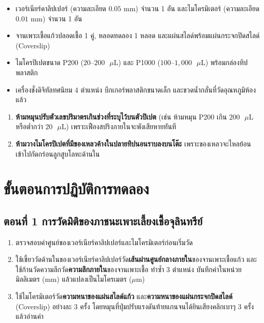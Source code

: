 \begin{equipbox}
\begin{itemize}
    \item เวอร์เนียร์คาลิปเปอร์ (ความละเอียด $0.05\text{ mm}$) จำนวน 1 อัน และไมโครมิเตอร์ (ความละเอียด $0.01\text{ mm}$) จำนวน 1 อัน
    \item จานเพาะเชื้อแก้วปลอดเชื้อ 1 คู่, หลอดทดลอง 1 หลอด และแผ่นสไลด์พร้อมแผ่นกระจกปิดสไลด์ (Coverslip)
    \item ไมโครปิเปตขนาด P200 ($20\text{--}200\text{ }\mu\text{L}$) และ P1000 ($100\text{--}1{,}000\text{ }\mu\text{L}$) พร้อมกล่องทิปพลาสติก
    \item เครื่องชั่งดิจิทัลทศนิยม 4 ตำแหน่ง บีกเกอร์พลาสติกขนาดเล็ก และขวดน้ำกลั่นที่วัดอุณหภูมิห้องแล้ว
\end{itemize}
\end{equipbox}

\begin{warningbox}
\begin{enumerate}
    \item \textbf{ห้ามหมุนปรับตัวเลขปริมาตรเกินช่วงที่ระบุไว้บนตัวปิเปต} (เช่น ห้ามหมุน P200 เกิน $200\text{ }\mu\text{L}$ หรือต่ำกว่า $20\text{ }\mu\text{L}$) เพราะเฟืองสปริงภายในจะพังเสียหายทันที
    \item \textbf{ห้ามวางไมโครปิเปตที่มีของเหลวค้างในปลายทิปนอนราบลงบนโต๊ะ} เพราะของเหลวจะไหลย้อนเข้าไปกัดกร่อนลูกสูบโลหะด้านใน
\end{enumerate}
\end{warningbox}

\section{ขั้นตอนการปฏิบัติการทดลอง}

\subsection{ตอนที่ 1 การวัดมิติของภาชนะเพาะเลี้ยงเชื้อจุลินทรีย์}
\begin{enumerate}
    \item ตรวจสอบค่าศูนย์ของเวอร์เนียร์คาลิปเปอร์และไมโครมิเตอร์ก่อนเริ่มวัด
    \item ใช้เขี้ยววัดด้านในของเวอร์เนียร์คาลิปเปอร์วัด\textbf{เส้นผ่านศูนย์กลางภายใน}ของจานเพาะเชื้อแก้ว และใช้ก้านวัดความลึกวัด\textbf{ความลึกภายใน}ของจานเพาะเชื้อ ทำซ้ำ 3 ตำแหน่ง บันทึกค่าในหน่วยมิลลิเมตร ($\text{mm}$) แล้วแปลงเป็นไมโครเมตร ($\mu\text{m}$)
    \item ใช้ไมโครมิเตอร์วัด\textbf{ความหนาของแผ่นสไลด์แก้ว} และ\textbf{ความหนาของแผ่นกระจกปิดสไลด์} (Coverslip) อย่างละ 3 ครั้ง โดยหมุนที่ปุ่มปรับแรงดันท้ายแกนจนได้ยินเสียงคลิกเบาๆ 3 ครั้ง แล้วอ่านค่า
\end{enumerate}

